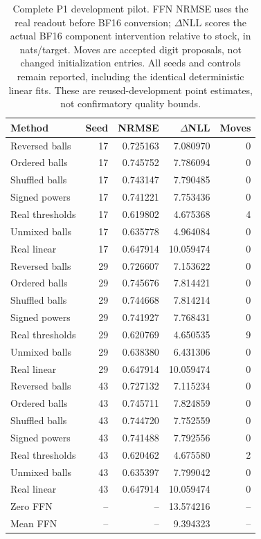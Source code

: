 \documentclass[11pt]{article}
\begin{document}
\begin{table}[htbp]
\centering\small
\caption{Complete P1 development pilot. FFN NRMSE uses the real readout
before BF16 conversion; \(\Delta\)NLL scores the actual BF16 component
intervention relative to stock, in nats/target. Moves are accepted digit
proposals, not changed initialization entries. All seeds and controls remain
reported, including the identical deterministic linear fits. These are
reused-development point estimates, not confirmatory quality bounds.}
\label{tab:ball-ffn-pilot}
\begin{tabular}{lrrrr}
\toprule
Method & Seed & NRMSE & \(\Delta\)NLL & Moves\\
\midrule
Reversed balls & 17 & 0.725163 & 7.080970 & 0 \\
Ordered balls & 17 & 0.745752 & 7.786094 & 0 \\
Shuffled balls & 17 & 0.743147 & 7.790485 & 0 \\
Signed powers & 17 & 0.741221 & 7.753436 & 0 \\
Real thresholds & 17 & 0.619802 & 4.675368 & 4 \\
Unmixed balls & 17 & 0.635778 & 4.964084 & 0 \\
Real linear & 17 & 0.647914 & 10.059474 & 0 \\
\midrule
Reversed balls & 29 & 0.726607 & 7.153622 & 0 \\
Ordered balls & 29 & 0.745676 & 7.814421 & 0 \\
Shuffled balls & 29 & 0.744668 & 7.814214 & 0 \\
Signed powers & 29 & 0.741927 & 7.768431 & 0 \\
Real thresholds & 29 & 0.620769 & 4.650535 & 9 \\
Unmixed balls & 29 & 0.638380 & 6.431306 & 0 \\
Real linear & 29 & 0.647914 & 10.059474 & 0 \\
\midrule
Reversed balls & 43 & 0.727132 & 7.115234 & 0 \\
Ordered balls & 43 & 0.745711 & 7.824859 & 0 \\
Shuffled balls & 43 & 0.744720 & 7.752559 & 0 \\
Signed powers & 43 & 0.741488 & 7.792556 & 0 \\
Real thresholds & 43 & 0.620462 & 4.675580 & 2 \\
Unmixed balls & 43 & 0.635397 & 7.799042 & 0 \\
Real linear & 43 & 0.647914 & 10.059474 & 0 \\
\midrule
Zero FFN & -- & -- & 13.574216 & -- \\
Mean FFN & -- & -- & 9.394323 & -- \\
\bottomrule
\end{tabular}
\end{table}
\end{document}
